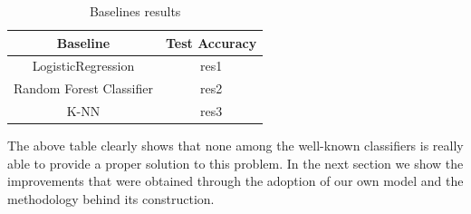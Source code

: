 \documentclass[10pt,conference,compsocconf]{IEEEtran}
\begin{document}
\begin{table}
\caption{Baselines results}
\label{tab:baselineres}
\begin{tabular}{ | c | c | }
\hline
Baseline & Test Accuracy  \\
\hline
LogisticRegression & res1 \\
\hline
Random Forest Classifier & res2 \\
\hline
K-NN & res3 \\
\hline
\end{tabular}
\end{table}




The above table clearly shows that none among the well-known classifiers is really able to provide a proper solution to this problem. In the next section we show the improvements that were obtained through the adoption of our own model and the methodology behind its construction. 
\end{document}
